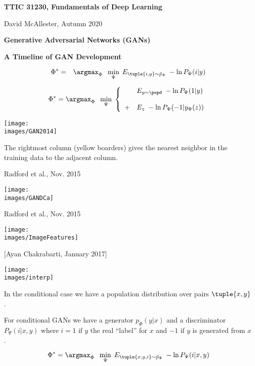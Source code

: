 





{\Huge

  \centerline{\bf TTIC 31230, Fundamentals of Deep Learning}
  \bigskip
  \centerline{David McAllester, Autumn 2020}
  \vfill
  \centerline{\bf Generative Adversarial Networks (GANs)}
  \vfill
  \centerline{\bf A Timeline of GAN Development}
\vfill
\vfill



\begin{eqnarray*}
\Phi^* & = & \argmax_\Phi\;\;\min_\Psi\;E_{\tuple{i,y} \sim \tilde{p}_\Phi}\;-\ln P_\Psi(i|y)
\end{eqnarray*}

\vfill
$$\Phi^* = \argmax_\Phi\;\;\min_\Psi\;\left\{\begin{array}{ll} & E_{y \sim \popd}\;-\ln P_\Psi(1|y) \\ \\ + &  E_z\;-\ln P_\Psi(-1|y_\Phi(z)) \end{array}\right.$$

\centerline{\texttt{[image: \\images/GAN2014]}}
The rightmost column (yellow boarders) gives the nearest neighbor in the training data to the adjacent column.

{Radford et al., Nov. 2015}

\centerline{\texttt{[image: \\images/GANDCa]}}

{Radford et al., Nov. 2015}

\centerline{\texttt{[image: \\images/ImageFeatures]}}


[Ayan Chakrabarti, January 2017]

\centerline{\texttt{[image: \\images/interp]}}

In the conditional case we have a population distribution over pairs $\tuple{x,y}$.

\vfill
For conditional GANs we have a generator $p_\Phi(y|x)$ and a discriminator $P_\Psi(i|x,y)$
where $i = 1$ if $y$ the real ``label'' for $x$ and $-1$ if $y$ is generated from $x$.

{\color{red} $$\Phi^* = \argmax_\Phi\;\;\min_\Psi\;E_{\tuple{x,y,i} \sim \tilde{p}_\Phi}\;-\ln P_\Psi(i|x,y)$$}

}
